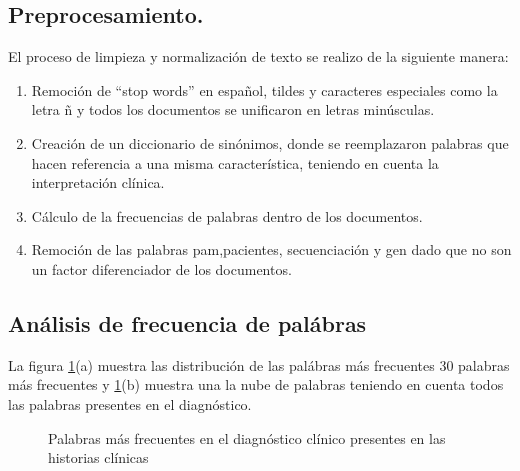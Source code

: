 \subsection{Preprocesamiento.}
    
El proceso de limpieza y normalización de texto se realizo de la siguiente manera:

 \begin{enumerate}
 	\item Remoción de ``stop words'' en español, tildes y caracteres especiales como la letra ñ y todos los documentos se unificaron en letras minúsculas.
 	\item Creación de un diccionario de sinónimos, donde se reemplazaron palabras que hacen referencia a una misma característica, teniendo en cuenta la interpretación clínica. 
 	\item Cálculo de la frecuencias de palabras dentro de los documentos. 
 	\item Remoción de las palabras pam,pacientes, secuenciación y gen dado que no son un factor diferenciador de los documentos.  	  
 \end{enumerate}

\subsection{Análisis de frecuencia de palábras}

La figura \ref{fig:sin}(a) muestra las distribución de las palábras más frecuentes 30 palabras más frecuentes y \ref{fig:sin}(b) muestra una la nube de palabras teniendo en cuenta todos las palabras presentes en el diagnóstico.\\

\begin{figure}[H]
	\centering
	\caption{Palabras más frecuentes en el diagnóstico clínico  presentes en las historias clínicas } \label{fig:sin}
\end{figure} 

